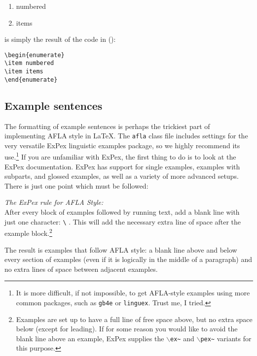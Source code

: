 \documentclass{afla}
\begin{document}
\begin{enumerate}
\item numbered
\item items
\end{enumerate}

\noindent is simply the result of the code in (\nextx):

\ex \verb`\begin{enumerate}`\\
	\verb`\item numbered`\\
	\verb`\item items`\\
	\verb`\end{enumerate}`
\xe

\subsection{Example sentences}

The formatting of example sentences is perhaps the trickiest part of implementing AFLA style in \LaTeX. The \verb`afla` class file includes settings for the very versatile ExPex linguistic examples package, so we highly recommend its use.\footnote{It is more difficult, if not impossible, to get AFLA-style examples using more common packages, such as \texttt{gb4e} or \texttt{linguex}. Trust me, I tried.} If you are unfamiliar with ExPex, the first thing to do is to look at the ExPex documentation. ExPex has support for single examples, examples with subparts, and glossed examples, as well as a variety of more advanced setups. There is just one point which must be followed:

\ex \textit{The ExPex rule for AFLA Style:}\\
	After every block of examples followed by running text, add a blank line with just one character: \verb`\` . This will add the necessary extra line of space after the example block.\footnote{Examples are set up to have a full line of free space above, but no extra space below (except for leading). If for some reason you would like to avoid the blank line above an example, ExPex supplies the $\backslash$\texttt{ex\~} and $\backslash$\texttt{pex\~} variants for this purpose.}
\xe
\

\noindent The result is examples that follow AFLA style: a blank line above and below every section of examples (even if it is logically in the middle of a paragraph) and no extra lines of space between adjacent examples.
\end{document}
